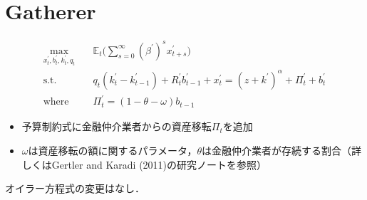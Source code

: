 \documentclass[dvipdfmx]{jlreq}
\begin{document}
\section{Gatherer}
\begin{align}
  \max_{x^\prime_t, b^\prime_t, k^\prime_t, q_t} \quad & \mathbb{E}_t \bigg( \sum_{s=0}^{\infty} (\beta^\prime)^s x^\prime_{t+s} \bigg) \label{eq:g_u} \\
  \text{s.t.} \quad & q_t(k^\prime_t - k^\prime_{t-1}) + R^\prime_t b^\prime_{t-1} + x^\prime_t = (z+k^\prime)^\alpha + \Pi^\prime_t + b^\prime_t \label{eq:g_yosan} \\
  \text{where} \quad & \Pi^\prime_t = (1-\theta-\omega) b_{t-1}
\end{align}
\begin{itemize}
  \item 予算制約式に金融仲介業者からの資産移転$\Pi_t$を追加
  \item $\omega$は資産移転の額に関するパラメータ，$\theta$は金融仲介業者が存続する割合（詳しくはGertler and Karadi (2011)の研究ノートを参照）
\end{itemize}
オイラー方程式の変更はなし．
\end{document}
